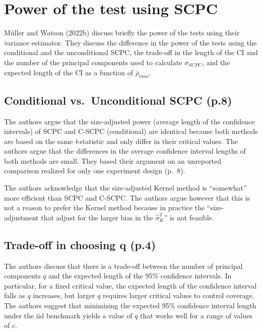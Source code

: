 \documentclass[
]{article}
\begin{document}
\hypertarget{power-of-the-test-using-scpc}{%
\section{Power of the test using
SCPC}\label{power-of-the-test-using-scpc}}

Müller and Watson (2022b) discuss briefly the power of the tests using
their variance estimator. They discuss the difference in the power of
the tests using the conditional and the unconditional SCPC, the
trade-off in the length of the CI and the number of the principal
components used to calculate \(\sigma_{SCPC}\), and the expected length
of the CI as a function of \(\bar\rho_{max}\).

\hypertarget{conditional-vs.-unconditional-scpc-p.8}{%
\subsection{Conditional vs.~Unconditional SCPC
(p.8)}\label{conditional-vs.-unconditional-scpc-p.8}}

The authors argue that the size-adjusted power (average length of the
confidence intervals) of SCPC and C-SCPC (conditional) are identical
because both methods are based on the same \emph{t}-statistic and only
differ in their critical values. The authors argue that the differences
in the average confidence interval lengths of both methods are small.
They based their argument on an unreported comparison realized for only
one experiment design (p.~8).

The authors acknowledge that the size-adjusted Kernel method is
``somewhat'' more efficient than SCPC and C-SCPC. The authors argue
however that this is not a reason to prefer the Kernel method because in
practice the ``size-adjustment that adjust for the larger bias in the
\(\hat\sigma_{K}^2\)'' is not feasible.

\hypertarget{trade-off-in-choosing-q-p.4}{%
\subsection{Trade-off in choosing q
(p.4)}\label{trade-off-in-choosing-q-p.4}}

The authors discuss that there is a trade-off between the number of
principal components \(q\) and the expected length of the 95\%
confidence intervals. In particular, for a fixed critical value, the
expected length of the confidence interval falls as \(q\) increases, but
larger \(q\) requires larger critical values to control coverage. The
authors suggest that minimizing the expected 95\% confidence interval
length under the iid benchmark yields a value of \(q\) that works well
for a range of values of \(c\).
\end{document}
